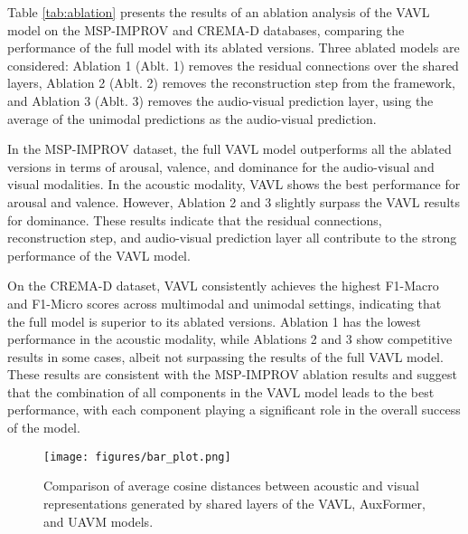 \documentclass{article}
\begin{document}
Table \ref{tab:ablation} presents the results of an ablation analysis of the VAVL model on the MSP-IMPROV and CREMA-D databases, comparing the performance of the full model with its ablated versions. Three ablated models are considered: Ablation 1 (Ablt. 1) removes the residual connections over the shared layers, Ablation 2 (Ablt. 2) removes the reconstruction step from the framework, and Ablation 3 (Ablt. 3) removes the audio-visual prediction layer, using the average of the unimodal predictions as the audio-visual prediction.

In the MSP-IMPROV dataset, the full VAVL model outperforms all the ablated versions in terms of arousal, valence, and dominance for the audio-visual and visual modalities. In the acoustic modality, VAVL shows the best performance for arousal and valence. However, Ablation 2 and 3 slightly surpass the VAVL results for dominance. These results indicate that the residual connections, reconstruction step, and audio-visual prediction layer all contribute to the strong performance of the VAVL model. 

On the CREMA-D dataset, VAVL consistently achieves the highest F1-Macro and F1-Micro scores across multimodal and unimodal settings, indicating that the full model is superior to its ablated versions. Ablation 1 has the lowest performance in the acoustic modality, while Ablations 2 and 3 show competitive results in some cases, albeit not surpassing the results of the full VAVL model. These results are consistent with the MSP-IMPROV ablation results and suggest that the combination of all components in the VAVL model leads to the best performance, with each component playing a significant role in the overall success of the model.

\begin{figure}[t]
    \centering
    \texttt{[image: figures/bar\_plot.png]}
    \caption{Comparison of average cosine distances between acoustic and visual representations generated by shared layers of the VAVL, AuxFormer, and UAVM models.}
    \label{fig:cosine}
\end{figure}
\end{document}

